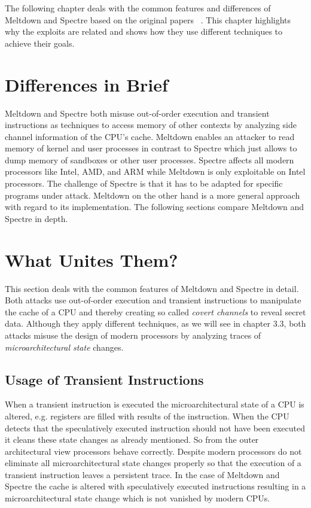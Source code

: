 \documentclass[a4paper,oneside,openright] {scrreprt}
\begin{document}
The following chapter deals with the common features and differences of Meltdown and Spectre based on the
 original papers ~\cite{lipp2018meltdown, kocher2018spectre}. This chapter highlights why the exploits are related
 and shows how they use different techniques to achieve their goals.
 
 
 \section{Differences in Brief}
 \label{ch:intro:motivation}
 
 Meltdown and Spectre both misuse out-of-order execution and transient instructions as techniques to access memory of 
 other contexts by analyzing side channel information of the CPU's cache. 
  Meltdown enables an attacker to read memory of kernel and user processes
  in contrast to Spectre which just allows to dump memory of sandboxes or other user processes. 
  Spectre affects all modern processors like Intel, AMD, and ARM while Meltdown
 is only exploitable on Intel processors. The challenge of Spectre is that it has to be adapted for specific programs under attack. 
 Meltdown on the other hand is a more general approach with regard to its implementation. The following sections compare Meltdown and Spectre in depth.
 
\section{What Unites Them?}
\label{ch:intro:motivation}

This section deals with the common features of Meltdown and Spectre in detail. 
Both attacks use out-of-order execution and transient instructions to manipulate the cache of a CPU and thereby
creating so called \textit{covert channels} to reveal secret data. Although they apply different techniques, 
as we will see in chapter 3.3, both attacks misuse the design of modern processors
by analyzing traces of \textit{microarchitectural state} changes. 

\subsection{Usage of Transient Instructions}
\label{ch:intro:motivation:A}

When a transient instruction is executed the microarchitectural state of a CPU is altered, e.g. registers are filled with results
of the instruction. When the CPU detects that the speculatively executed instruction should not have been executed it cleans these state
changes as already mentioned. So from the outer architectural view processors behave correctly. 
Despite modern processors do not eliminate all microarchitectural state changes properly so that the execution of a transient instruction
 leaves a persistent trace. In the case of Meltdown and Spectre the cache is altered with speculatively executed instructions resulting
 in a microarchitectural state change which is not vanished by modern CPUs.
\end{document}
